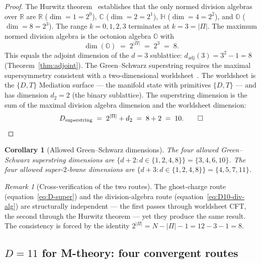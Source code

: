 \documentclass[11pt,a4paper]{article}
\newtheorem{corollary}[theorem]{Corollary}
\theoremstyle{definition}
\theoremstyle{remark}
\newtheorem{remark}[theorem]{Remark}
\newcommand{\R}{\mathbb{R}}
\newcommand{\C}{\mathbb{C}}
\begin{document}
\begin{proof}
The Hurwitz theorem~\cite{Hurwitz1898} establishes that the only normed division algebras over $\R$ are $\R$ ($\dim = 1 = 2^{0}$), $\C$ ($\dim = 2 = 2^{1}$), $\mathbb{H}$ ($\dim = 4 = 2^{2}$), and $\mathbb{O}$ ($\dim = 8 = 2^{3}$). The range $k = 0,1,2,3$ terminates at $k = 3 = |\Pi|$. The maximum normed division algebra is the octonion algebra $\mathbb{O}$ with
\[
\dim(\mathbb{O}) \;=\; 2^{|\Pi|} \;=\; 2^{3} \;=\; 8.
\]
This equals the adjoint dimension of the $d=3$ sublattice: $d_{\mathrm{adj}}(3) = 3^{2}-1 = 8$ (Theorem~\ref{thm:adjoint}). The Green--Schwarz superstring requires the maximal supersymmetry consistent with a two-dimensional worldsheet~\cite{BaezHuertaI,BaezHuertaII}. The worldsheet is the $\{D,T\}$ Mediation surface --- the manifold state with primitives $\{D,T\}$ --- and has dimension $d_{2} = 2$ (the binary sublattice). The superstring dimension is the sum of the maximal division algebra dimension and the worldsheet dimension:
\[
D_{\mathrm{superstring}} \;=\; 2^{|\Pi|} + d_{2} \;=\; 8 + 2 \;=\; 10. \qed
\]
\end{proof}

\begin{corollary}[Allowed Green--Schwarz dimensions]\label{cor:GS-dims}
The four allowed Green--Schwarz superstring dimensions are $\{d + 2 : d \in \{1,2,4,8\}\} = \{3,4,6,10\}$. The four allowed super-$2$-brane dimensions are $\{d + 3 : d \in \{1,2,4,8\}\} = \{4,5,7,11\}$.
\end{corollary}

\begin{remark}[Cross-verification of the two routes]
The ghost-charge route (equation~\eqref{eq:D-super}) and the division-algebra route (equation~\eqref{eq:D10-div-alg}) are structurally independent --- the first passes through worldsheet CFT, the second through the Hurwitz theorem --- yet they produce the same result. The consistency is forced by the identity $2^{|\Pi|} = N - |\Pi| - 1 = 12 - 3 - 1 = 8$.
\end{remark}

\subsection{$D = 11$ for M-theory: four convergent routes}\label{subsec:D11}
\end{document}
